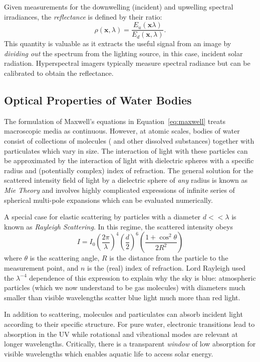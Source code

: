 Given measurements for the downwelling (incident) and upwelling spectral
irradiances, the \textit{reflectance} is defined by their ratio:
\begin{equation}
  \rho(\mathbf{x},\lambda) = \dfrac{E_u(\mathbf{x}\lambda)}{E_d(\mathbf{x}, \lambda)}.
\end{equation}
This quantity is valuable as it extracts the useful signal from an image by
\textit{dividing out} the spectrum from the lighting source, in this case,
incident solar radiation. Hyperspectral imagers typically measure spectral
radiance but can be calibrated to obtain the reflectance.

\subsection{Optical Properties of Water Bodies}\label{sec:optical-properties-water}

The formulation of Maxwell's equations in Equation~\ref{eq:maxwell} treats
macroscopic media as continuous. However, at atomic scales, bodies of water
consist of collections of molecules ( and other dissolved substances)
together with particulates which vary in size. The interaction of light with
these particles can be approximated by the interaction of light with dielectric
spheres with a specific radius and (potentially complex) index of refraction.
The general solution for the scattered intensity field of light by a dielectric
sphere of \textit{any} radius is known as \textit{Mie Theory} and involves
highly complicated expressions of infinite series of spherical multi-pole
expansions which can be evaluated numerically.

A special case for elastic scattering by particles with a diameter $d <<
\lambda$ is known as \textit{Rayleigh Scattering}. In this regime, the scattered
intensity obeys
\begin{equation}
  I = I_0  \left( \frac{2\pi}{\lambda} \right)^4 \left( \frac{d}{2} \right)^6 \left( \frac{1 + \cos^2\theta}{2R^2} \right)
\end{equation}
where $\theta$ is the scattering angle, $R$ is the distance from the particle to
the measurement point, and $n$ is the (real) index of refraction. Lord Rayleigh
used the $\lambda^{-4}$ dependence of this expression to explain why the sky is
blue: atmospheric particles (which we now understand to be gas molecules) with
diameters much smaller than visible wavelengths scatter blue light
much more than red light.

In addition to scattering, molecules and particulates can absorb incident light
according to their specific structure. For pure water, electronic transitions
lead to absorption in the UV while rotational and vibrational modes are relevant
at longer wavelengths. Critically, there is a transparent \textit{window} of low
absorption for visible wavelengths which enables aquatic life to access solar
energy.

